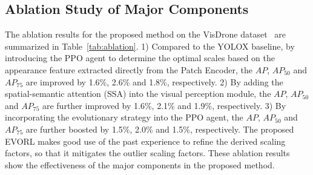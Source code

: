 \documentclass[letterpaper]{article} %
\newcommand\blue[1]{\textcolor{blue}{#1}}
\begin{document}
\subsection{Ablation Study of Major Components}
\label{ssec: ablation-study}
The ablation results for the proposed method on the VisDrone dataset~\cite{Zhu_2022_VisDrone} are summarized in Table~\ref{tab:ablation}.
1) Compared to the YOLOX baseline, by introducing the PPO agent to determine the optimal scales based on the appearance feature extracted directly from the Patch Encoder, the $AP$, $AP_{50}$ and $AP_{75}$ are improved by 1.6\%, 2.6\% and 1.8\%, respectively.
2) By adding the spatial-semantic attention (SSA) into the visual perception module, the $AP$, $AP_{50}$ and $AP_{75}$ are further improved by 1.6\%, 2.1\% and 1.9\%, respectively.
3) By incorporating the evolutionary strategy into the PPO agent, the $AP$, $AP_{50}$ and $AP_{75}$ are further boosted by 1.5\%, 2.0\% and 1.5\%, respectively.
The proposed EVORL makes good use of the past experience to refine the derived scaling factors, so that it mitigates the outlier scaling factors. These ablation results show the effectiveness of the major components in the proposed method.
\end{document}
